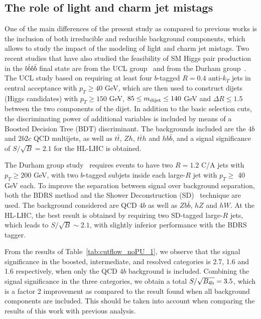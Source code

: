 \subsection{The role of light  and charm jet mistags}

One of the main differences of the present study as compared
to previous works is the inclusion of both irreducible
and reducible background components, which allows
to study the impact of the modeling of light and charm jet mistags. 
%
Two recent studies that have also studied the
feasibility of SM Higgs pair production in the $b\bar{b}b\bar{b}$
final state are from the UCL group~\cite{Wardrope:2014kya} and from
the
Durham group~\cite{deLima:2014dta}.
%
The UCL study based
on requiring at least four $b$-tagged $R=0.4$ anti-$k_T$ jets
in central acceptance with $p_T \ge 40$ GeV, which are
then used to construct dijets (Higgs candidates) with
$p_T \ge 150$ GeV, $85 \le m_{\rm dijet} \le 140$ GeV
and $\Delta R \le 1.5$ between the two components
of the dijet.
%
In addition to the basic selection cuts, the discriminating
power of
additional variables is included by means of a 
Boosted Decision Tree (BDT) discriminant.
%
The backgrounds included are the $4b$ and
$2b2c$ QCD multijets, as well as
$t\bar{t}$, $Zh$, $t\bar{t}h$ and $hb\bar{b}$,
and a signal significance of $S/\sqrt{B}=2.1$ for the HL-LHC
is obtained.

The Durham group study~\cite{deLima:2014dta} requires events
to have two $R=1.2$ C/A jets with $p_T\ge 200$ GeV, with
two $b$-tagged subjets inside each large-$R$ jet with
$p_T \ge$ 40 GeV each.
%
To improve the separation between
signal over background separation, both the BDRS
method and the Shower Deconstruction (SD)~\cite{Soper:2011cr,Soper:2012pb}
technique are used.
%
The background considered are QCD $4b$ as well as $Zb\bar{b}$, $hZ$ and
$hW$.
%
At the HL-LHC, the best result is obtained by requiring two
SD-tagged large-$R$ jets, which leads to $S/\sqrt{B}\sim 2.1$, with
 slightly inferior performance with the BDRS tagger.
 

%
 From the results of Table~\ref{tab:cutflow_noPU_1}, we observe
 that the signal significance in the boosted, intermediate,
 and resolved categories is 2.7, 1.6 and 1.6 respectively,
 when only the QCD $4b$ background is included.
 Combining the signal significance in the three categories,
 we
 obtain  a total $S/\sqrt{B_{\rm 4b}}=3.5$, which is a factor
 2 improvement as compared to the result found when
 all background components are included.
 This should be taken into account when comparing
 the results of this work with previous analysis.


